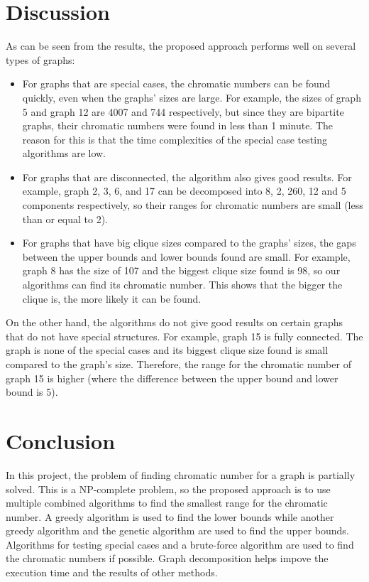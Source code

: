 \documentclass[a4paper]{report}
\begin{document}
	\chapter{Discussion}
	As can be seen from the results, the proposed approach performs well on several types of graphs:
	\begin{itemize}
		\item For graphs that are special cases, the chromatic numbers can be found quickly, even when the graphs' sizes are large. For example, the sizes of graph 5 and graph 12 are 4007 and 744 respectively, but since they are bipartite graphs, their chromatic numbers were found in less than 1 minute. The reason for this is that the time complexities of the special case testing algorithms are low.
		\item For graphs that are disconnected, the algorithm also gives good results. For example, graph 2, 3, 6, and 17 can be decomposed into 8, 2, 260, 12 and 5 components respectively, so their ranges for chromatic numbers are small (less than or equal to 2).
		\item For graphs that have big clique sizes compared to the graphs' sizes, the gaps between the upper bounds and lower bounds found are small. For example, graph 8 has the size of 107 and the biggest clique size found is 98, so our algorithms can find its chromatic number. This shows that the bigger the clique is, the more likely it can be found.
	\end{itemize}
	On the other hand, the algorithms do not give good results on certain graphs that do not have special structures. For example, graph 15 is fully connected. The graph is none of the special cases and its biggest clique size found is small compared to the graph's size. Therefore, the range for the chromatic number of graph 15 is higher (where the difference between the upper bound and lower bound is 5).
	
	\chapter{Conclusion}
	In this project, the problem of finding chromatic number for a graph is partially solved. This is a NP-complete problem, so the proposed approach is to use multiple combined algorithms to find the smallest range for the chromatic number. A greedy algorithm is used to find the lower bounds while another greedy algorithm and the genetic algorithm are used to find the upper bounds. Algorithms for testing special cases and a brute-force algorithm are used to find the chromatic numbers if possible. Graph decomposition helps impove the execution time and the results of other methods. \\
	
\end{document}
